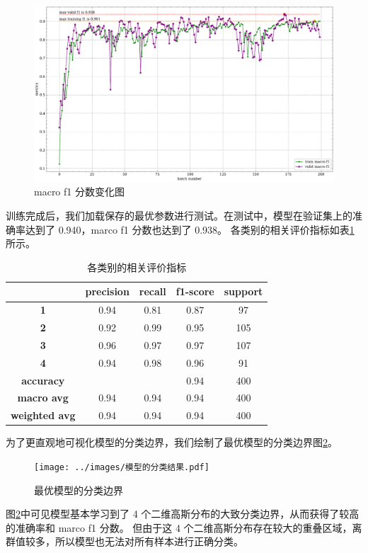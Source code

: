 \documentclass[supercite]{Experimental_Report}
\theoremstyle{definition}
\begin{document}
\begin{figure}[H]
	\begin{center}
		\includegraphics[scale=0.35]{../images/训练验证f1.pdf}
		\caption{macro f1 分数变化图}
		\label{训练验证f1}
	\end{center}
\end{figure}

训练完成后，我们加载保存的最优参数进行测试。在测试中，模型在验证集上的准确率达到了 0.940，marco f1 分数也达到了 0.938。
各类别的相关评价指标如表\ref{各类别评价指标}所示。
\begin{table}[H]
	\centering
	\caption{各类别的相关评价指标}
	  \begin{tabular}{ccccc}
		\toprule
			& \textbf{precision} & \textbf{recall} & \textbf{f1-score} & \textbf{support} \\\hline
	  \textbf{1} & 0.94  & 0.81  & 0.87  & 97 \\
	  \textbf{2} & 0.92  & 0.99  & 0.95  & 105 \\
	  \textbf{3} & 0.96  & 0.97  & 0.97  & 107 \\
	  \textbf{4} & 0.94  & 0.98  & 0.96  & 91 \\
	  \textbf{accuracy} &       &       & 0.94  & 400 \\
	  \textbf{macro avg} & 0.94  & 0.94  & 0.94  & 400 \\
	  \textbf{weighted avg} & 0.94  & 0.94  & 0.94  & 400 \\
	  \bottomrule
	  \end{tabular}
	\label{各类别评价指标}
  \end{table}
  
为了更直观地可视化模型的分类边界，我们绘制了最优模型的分类边界图\ref{模型的分类结果}。
\begin{figure}[H]
	\begin{center}
		\texttt{[image: ../images/模型的分类结果.pdf]}
		\caption{最优模型的分类边界}
		\label{模型的分类结果}
	\end{center}
\end{figure}
图\ref{模型的分类结果}中可见模型基本学习到了 4 个二维高斯分布的大致分类边界，从而获得了较高的准确率和 marco f1 分数。
但由于这 4 个二维高斯分布存在较大的重叠区域，离群值较多，所以模型也无法对所有样本进行正确分类。
\end{document}
